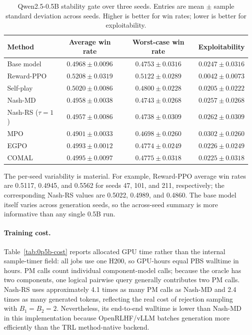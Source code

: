 \begin{table}[t]
  \centering
  \caption{Qwen2.5-0.5B stability gate over three seeds.  Entries are
  mean $\pm$ sample standard deviation across seeds.  Higher is better for
  win rates; lower is better for exploitability.}
  \label{tab:0p5b-main}
  \small
  \begin{tabular}{lccc}
    \toprule
    Method & Average win rate & Worst-case win rate & Exploitability \\
    \midrule
    Base model & $0.4968\pm0.0096$ & $0.4753\pm0.0316$ & $0.0247\pm0.0316$ \\
    Reward-PPO & $\mathbf{0.5208\pm0.0319}$ & $\mathbf{0.5122\pm0.0289}$ & $\mathbf{0.0042\pm0.0073}$ \\
    Self-play & $0.5020\pm0.0086$ & $0.4800\pm0.0228$ & $0.0205\pm0.0222$ \\
    Nash-MD & $0.4958\pm0.0038$ & $0.4743\pm0.0268$ & $0.0257\pm0.0268$ \\
    Nash-RS ($\tau=1$) & $0.4957\pm0.0086$ & $0.4738\pm0.0309$ & $0.0262\pm0.0309$ \\
    MPO & $0.4901\pm0.0033$ & $0.4698\pm0.0260$ & $0.0302\pm0.0260$ \\
    EGPO & $0.4993\pm0.0012$ & $0.4774\pm0.0249$ & $0.0226\pm0.0249$ \\
    COMAL & $0.4995\pm0.0097$ & $0.4775\pm0.0318$ & $0.0225\pm0.0318$ \\
    \bottomrule
  \end{tabular}
\end{table}

The per-seed variability is material.  For example, Reward-PPO average win
rates are 0.5117, 0.4945, and 0.5562 for seeds 47, 101, and 211, respectively;
the corresponding Nash-RS values are 0.5022, 0.4989, and 0.4860.  The base
model itself varies across generation seeds, so the across-seed summary is
more informative than any single 0.5B run.

\paragraph{Training cost.}
Table~\ref{tab:0p5b-cost} reports allocated GPU time rather than the internal
sample-timer field: all jobs use one H200, so GPU-hours equal PBS walltime in
hours.  PM calls count individual component-model calls; because the oracle has
two components, one logical pairwise query generally contributes two PM calls.
Nash-RS uses approximately 4.1 times as many PM calls as Nash-MD and 2.4 times
as many generated tokens, reflecting the real cost of rejection sampling with
$B_1=B_2=2$.  Nevertheless, its end-to-end walltime is lower than Nash-MD in
this implementation because OpenRLHF/vLLM batches generation more efficiently
than the TRL method-native backend.


